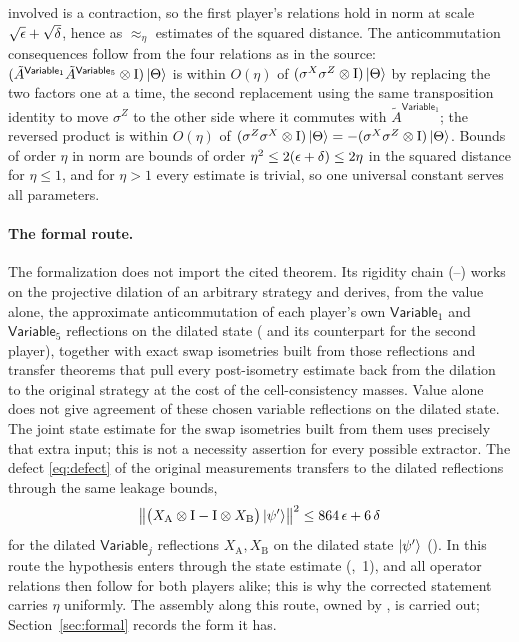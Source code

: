 \documentclass[11pt]{article}
\newcommand{\Id}{\mathrm{I}}
\newcommand{\Variable}{\mathsf{Variable}}
\begin{document}
involved is a contraction, so the first player's relations hold in norm at
scale $\sqrt{\epsilon} + \sqrt\delta$, hence as $\approx_\eta$ estimates of the
squared distance.  The anticommutation consequences follow from the four
relations as in the source: $(\tilde A^{\Variable_1}\tilde A^{\Variable_5}
\ot \Id)\ket\Theta$ is within $O(\eta)$ of
$(\sigma^X\sigma^Z \ot \Id)\ket\Theta$ by replacing the two factors one at a
time, the second replacement using the same transposition identity to move
$\sigma^Z$ to the other side where it commutes with $\tilde A^{\Variable_1}$;
the reversed product is within $O(\eta)$ of
$(\sigma^Z\sigma^X \ot \Id)\ket\Theta = -(\sigma^X\sigma^Z \ot \Id)\ket\Theta$.
Bounds of order $\eta$ in norm are bounds of order $\eta^2 \le 2(\epsilon+\delta)
\le 2\eta$ in the squared distance for $\eta \le 1$, and for $\eta > 1$ every
estimate is trivial, so one universal constant serves all parameters.

\paragraph{The formal route.}
The formalization does not import the cited theorem.  Its rigidity chain
(--) works on the projective dilation of an
arbitrary strategy and derives, from the value alone, the approximate
anticommutation of each player's own $\Variable_1$ and $\Variable_5$
reflections on the dilated state
( and its
counterpart for the second player), together with exact swap isometries built
from those reflections and transfer theorems that pull every post-isometry
estimate back from the dilation to the original strategy at the cost of the
cell-consistency masses. Value alone does not give agreement of these chosen
variable reflections on the dilated state. The joint state estimate for the
swap isometries built from them uses precisely that extra input; this is not a
necessity assertion for every possible extractor. The defect
\eqref{eq:defect} of the original measurements transfers
to the dilated reflections through the same leakage bounds,
\[
  \bigl\| \bigl( X_{\mathrm A} \ot \Id - \Id \ot X_{\mathrm B} \bigr)
    \ket{\psi'} \bigr\|^2 \le 864\,\eps + 6\,\delta
\]
for the dilated $\Variable_j$ reflections $X_{\mathrm A}, X_{\mathrm B}$ on the
dilated state $\ket{\psi'}$
(). In
this route the hypothesis enters through the state estimate
(,~1), and all operator relations then follow for both
players alike; this is why the corrected statement carries $\eta$ uniformly.
The assembly along this route, owned by , is carried out;
Section~\ref{sec:formal} records the form it has.
\end{document}
